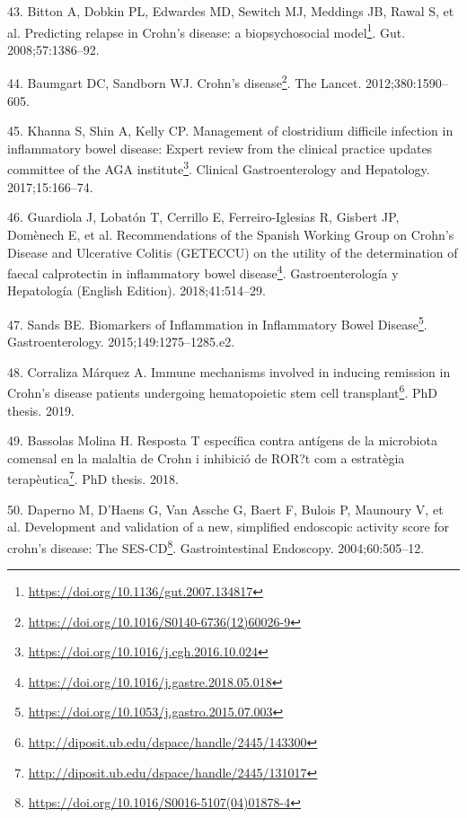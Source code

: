 \documentclass[
  a4paper,
]{book}
\DeclareRobustCommand{\href}[2]{#2\footnote{\url{#1}}}
\newlength{\cslhangindent}
\newlength{\cslentryspacingunit} %
\newenvironment{CSLReferences}[2] %
 {%
  \setlength{\parindent}{0pt}
  \ifodd #1
  \let\oldpar\par
  \def\par{\hangindent=\cslhangindent\oldpar}
  \fi
  \setlength{\parskip}{#2\cslentryspacingunit}
 }%
 {}
\begin{document}
\begin{CSLReferences}{0}{0}
\leavevmode{}%
43. Bitton A, Dobkin PL, Edwardes MD, Sewitch MJ, Meddings JB, Rawal S, et al. \href{https://doi.org/10.1136/gut.2007.134817}{Predicting relapse in Crohn's disease: a biopsychosocial model}. Gut. 2008;57:1386--92.

\leavevmode{}%
44. Baumgart DC, Sandborn WJ. \href{https://doi.org/10.1016/S0140-6736(12)60026-9}{Crohn's disease}. The Lancet. 2012;380:1590--605.

\leavevmode{}%
45. Khanna S, Shin A, Kelly CP. \href{https://doi.org/10.1016/j.cgh.2016.10.024}{Management of clostridium difficile infection in inflammatory bowel disease: Expert review from the clinical practice updates committee of the AGA institute}. Clinical Gastroenterology and Hepatology. 2017;15:166--74.

\leavevmode{}%
46. Guardiola J, Lobatón T, Cerrillo E, Ferreiro-Iglesias R, Gisbert JP, Domènech E, et al. \href{https://doi.org/10.1016/j.gastre.2018.05.018}{Recommendations of the Spanish Working Group on Crohn's Disease and Ulcerative Colitis (GETECCU) on the utility of the determination of faecal calprotectin in inflammatory bowel disease}. Gastroenterología y Hepatología (English Edition). 2018;41:514--29.

\leavevmode{}%
47. Sands BE. \href{https://doi.org/10.1053/j.gastro.2015.07.003}{Biomarkers of Inflammation in Inflammatory Bowel Disease}. Gastroenterology. 2015;149:1275--1285.e2.

\leavevmode{}%
48. Corraliza Márquez A. \href{http://diposit.ub.edu/dspace/handle/2445/143300}{Immune mechanisms involved in inducing remission in Crohn{'}s disease patients undergoing hematopoietic stem cell transplant}. PhD thesis. 2019.

\leavevmode{}%
49. Bassolas Molina H. \href{http://diposit.ub.edu/dspace/handle/2445/131017}{Resposta T específica contra antígens de la microbiota comensal en la malaltia de Crohn i inhibició de ROR?t com a estratègia terapèutica}. PhD thesis. 2018.

\leavevmode{}%
50. Daperno M, D'Haens G, Van Assche G, Baert F, Bulois P, Maunoury V, et al. \href{https://doi.org/10.1016/S0016-5107(04)01878-4}{Development and validation of a new, simplified endoscopic activity score for crohn's disease: The SES-CD}. Gastrointestinal Endoscopy. 2004;60:505--12.


\end{CSLReferences}
\end{document}
